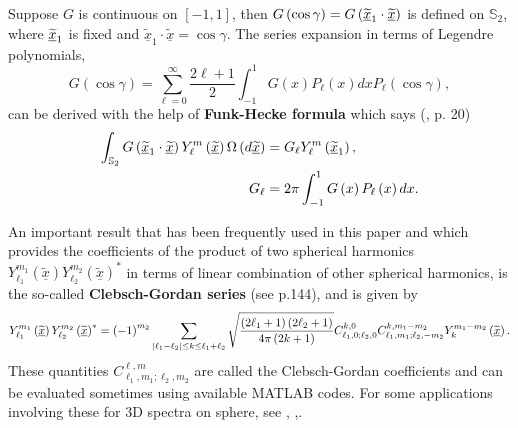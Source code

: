 \documentclass[preprint,11pt,a4paper]{elsarticle}
\begin{document}
Suppose $G$ is continuous on $\left[ -1,1\right] $, then $G\left(
\cos\gamma\right) =G\left( \underline{\widetilde{x}}_{1}\cdot \underline{%
\widetilde{x}}\right) $ is defined on $\mathbb{S}_{2}$, where $\underline{%
\widetilde{x}}_{1}$ is fixed and $\underline{\widetilde{x}}_{1}\cdot%
\underline{\widetilde{x}}=\cos\gamma$. The series expansion in terms of
Legendre polynomials, 
\begin{equation*}
G\left( \cos\gamma\right) =\sum_{\ell=0}^{\infty}\frac{2\ell+1}{2}%
\int_{-1}^{1}G\left( x\right) P_{\ell}\left( x\right) dxP_{\ell}\left(
\cos\gamma\right) ,
\end{equation*}
can be derived with the help of \textbf{Funk-Hecke formula} which says (\cite%
{Mueller1966}, p. 20)%
\begin{align}
\int_{\mathbb{S}_{2}}G\left( \underline{\widetilde{x}}_{1}\cdot \underline{%
\widetilde{x}}\right) Y_{\ell}^{m}\left( \underline{\widetilde{x}}\right)
\Omega\left( d\underline{\widetilde{x}}\right) & =G_{\ell
}Y_{\ell}^{m}\left( \underline{\widetilde{x}}_{1}\right) ,
\label{Formula_Funk-Hecke} \\
G_{\ell} & =2\pi\int_{-1}^{1}G\left( x\right) P_{\ell}\left( x\right) dx. 
\notag
\end{align}

\smallskip An important result that has been frequently used in this paper
and which provides the coefficients of the product of two spherical
harmonics $Y_{\ell_{1}}^{m_{1}}\left( \underline{\widetilde{x}}\right)
Y_{\ell_{2}}^{m_{2}}\left( \underline{\widetilde{x}}\right) ^{\ast}$ in
terms of linear combination of other spherical harmonics, is the so-called 
\textbf{Clebsch-Gordan series} (see \cite{Varshalovich1988} p.144), and is
given by 
\begin{equation}
Y_{\ell_{1}}^{m_{1}}\left( \underline{\widetilde{x}}\right)
Y_{\ell_{2}}^{m_{2}}\left( \underline{\widetilde{x}}\right) ^{\ast}=\left(
-1\right) ^{m_{2}}\sum_{\left\vert \ell_{1}-\ell_{2}\right\vert \leq
k\leq\ell_{1}+\ell_{2}}\sqrt{\frac{\left( 2\ell_{1}+1\right) \left(
2\ell_{2}+1\right) }{4\pi\left( 2k+1\right) }}C_{\ell_{1},0;%
\ell_{2},0}^{k,0}C_{\ell_{1},m_{1};%
\ell_{2},-m_{2}}^{k,m_{1}-m_{2}}Y_{k}^{m_{1}-m_{2}}\left( \underline{%
\widetilde{x}}\right) .  \label{Clebsch_Gordan_series}
\end{equation}
These quantities $C_{\ell_{1},m_{1};\ell_{2},m_{2}}^{\ell,m}$ are called the
Clebsch-Gordan coefficients and can be evaluated sometimes using available
MATLAB codes. For some applications involving these for 3D spectra on
sphere, see \cite{Marinucci2010}, \cite{Ter2015},.
\end{document}
